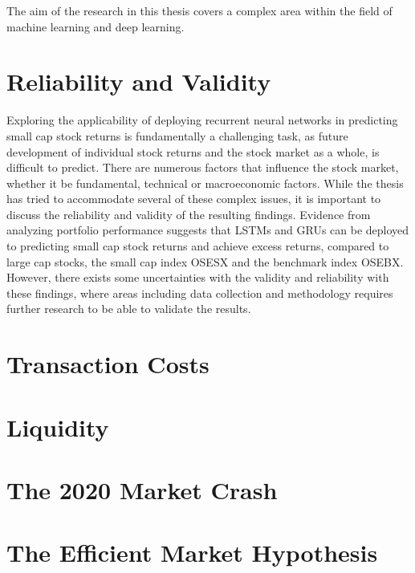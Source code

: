 The aim of the research in this thesis covers a complex area within the field of machine learning and deep learning.    

\section{Reliability and Validity}
Exploring the applicability of deploying recurrent neural networks in predicting small cap stock returns is fundamentally a challenging task, as future development of individual stock returns and the stock market as a whole, is difficult to predict. There are numerous factors that influence the stock market, whether it be fundamental, technical or macroeconomic factors. While the thesis has tried to accommodate several of these complex issues, it is important to discuss the reliability and validity of the resulting findings. Evidence from analyzing portfolio performance suggests that LSTMs and GRUs can be deployed to predicting small cap stock returns and achieve excess returns, compared to large cap stocks, the small cap index OSESX and the benchmark index OSEBX. However, there exists some uncertainties with the validity and reliability with these findings, where areas including data collection and methodology requires further research to be able to validate the results.      

\section{Transaction Costs}

\section{Liquidity}

\section{The 2020 Market Crash}

\section{The Efficient Market Hypothesis}


